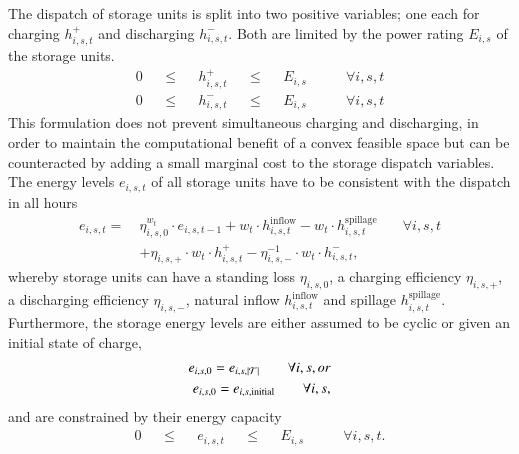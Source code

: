The dispatch of storage units is split into two positive variables;
one each for charging $h_{i,s,t}^+$ and discharging $h_{i,s,t}^-$.
Both are limited by the power rating $E_{i,s}$ of the storage units.
\begin{align}
  0 &  & \leq &  & h_{i,s,t}^+ &  & \leq &  & E_{i,s} & \qquad\forall i, s, t \label{eq:sto1} \\
  0 &  & \leq &  & h_{i,s,t}^- &  & \leq &  & E_{i,s} & \qquad\forall i, s, t \label{eq:sto2}
\end{align}
This formulation does not prevent simultaneous charging and discharging,
in order to maintain the computational benefit of a convex feasible space but
can be counteracted by adding a small marginal cost to the storage dispatch
variables. The energy levels $e_{i,s,t}$ of all storage units have to be
consistent with the dispatch in all hours
\begin{align}
  e_{i,s,t} =\: & \eta_{i,s,0}^{w_t} \cdot e_{i,s,t-1} + w_t \cdot h_{i,s,t}^\text{inflow} - w_t \cdot h_{i,s,t}^\text{spillage} & \quad\forall i, s, t \nonumber \\
                & + \eta_{i,s,+} \cdot w_t \cdot h_{i,s,t}^+ - \eta_{i,s,-}^{-1} \cdot w_t \cdot h_{i,s,t}^-, \label{eq:stoe}
\end{align}
whereby storage units can have a standing loss $\eta_{i,s,0}$, a charging efficiency $\eta_{i,s,+}$, a discharging efficiency $\eta_{i,s,-}$,
natural inflow $h_{i,s,t}^\text{inflow}$ and spillage $h_{i,s,t}^\text{spillage}$.
Furthermore, the storage energy levels are either assumed to be cyclic or given an initial state of charge,
\begin{align}
  e_{i,s,0} = e_{i,s,\left|\mathcal{T}\right|} \qquad\forall i, s, or\\
  e_{i,s,0} = e_{i,s,\text{initial}} \qquad\forall i, s,
\end{align}
and are constrained by their energy capacity
\begin{align}
  0 &  & \leq &  & e_{i,s,t} &  & \leq &  & E_{i,s} & \qquad\forall i, s, t.
\end{align}

